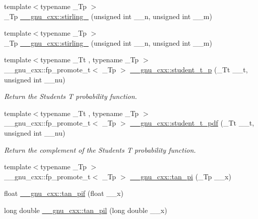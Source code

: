 \begin{DoxyCompactItemize}
\item 
{\footnotesize template$<$typename \+\_\+\+Tp $>$ }\\\+\_\+\+Tp \hyperlink{group__gnu__math__spec__func_ga2b955dac7d2c5125f2091eaeb25c8ad2}{\+\_\+\+\_\+gnu\+\_\+cxx\+::stirling\+\_} (unsigned int \+\_\+\+\_\+n, unsigned int \+\_\+\+\_\+m)
\item 
{\footnotesize template$<$typename \+\_\+\+Tp $>$ }\\\+\_\+\+Tp \hyperlink{group__gnu__math__spec__func_ga3761c0e467cbe45cbda66a4e796adcd3}{\+\_\+\+\_\+gnu\+\_\+cxx\+::stirling\+\_} (unsigned int \+\_\+\+\_\+n, unsigned int \+\_\+\+\_\+m)
\item 
{\footnotesize template$<$typename \+\_\+\+Tt , typename \+\_\+\+Tp $>$ }\\\+\_\+\+\_\+gnu\+\_\+cxx\+::fp\+\_\+promote\+\_\+t$<$ \+\_\+\+Tp $>$ \hyperlink{group__gnu__math__spec__func_ga5a84386b009ac57a726d5d0314fdf7ce}{\+\_\+\+\_\+gnu\+\_\+cxx\+::student\+\_\+t\+\_\+p} (\+\_\+\+Tt \+\_\+\+\_\+t, unsigned int \+\_\+\+\_\+nu)
\begin{DoxyCompactList}\small\item\em Return the Students T probability function. \end{DoxyCompactList}\item 
{\footnotesize template$<$typename \+\_\+\+Tt , typename \+\_\+\+Tp $>$ }\\\+\_\+\+\_\+gnu\+\_\+cxx\+::fp\+\_\+promote\+\_\+t$<$ \+\_\+\+Tp $>$ \hyperlink{group__gnu__math__spec__func_ga95a4c03cf0a8104e9a15a35acfe5fb3a}{\+\_\+\+\_\+gnu\+\_\+cxx\+::student\+\_\+t\+\_\+pdf} (\+\_\+\+Tt \+\_\+\+\_\+t, unsigned int \+\_\+\+\_\+nu)
\begin{DoxyCompactList}\small\item\em Return the complement of the Students T probability function. \end{DoxyCompactList}\item 
{\footnotesize template$<$typename \+\_\+\+Tp $>$ }\\\+\_\+\+\_\+gnu\+\_\+cxx\+::fp\+\_\+promote\+\_\+t$<$ \+\_\+\+Tp $>$ \hyperlink{group__gnu__math__spec__func_ga12855bd62fe6a955ef0d1d5e92c85ba9}{\+\_\+\+\_\+gnu\+\_\+cxx\+::tan\+\_\+pi} (\+\_\+\+Tp \+\_\+\+\_\+x)
\item 
float \hyperlink{group__gnu__math__spec__func_gaab32e2d76da811451e84232320ddf80c}{\+\_\+\+\_\+gnu\+\_\+cxx\+::tan\+\_\+pif} (float \+\_\+\+\_\+x)
\item 
long double \hyperlink{group__gnu__math__spec__func_ga3546906a5bb8f128c893dddef72e2f20}{\+\_\+\+\_\+gnu\+\_\+cxx\+::tan\+\_\+pil} (long double \+\_\+\+\_\+x)

\end{DoxyCompactItemize}
